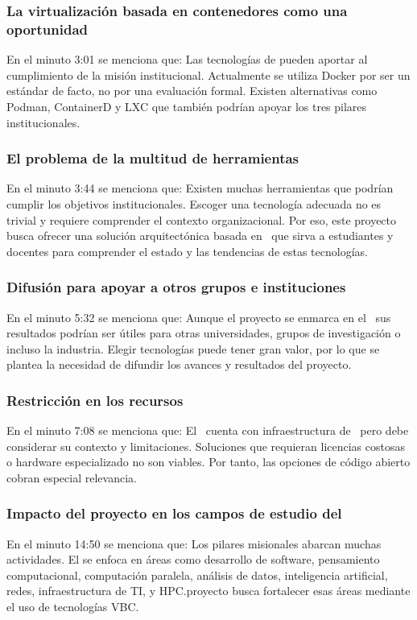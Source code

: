 \subsubsection{La virtualización basada en contenedores como una oportunidad}
En el minuto 3:01 se menciona que: Las tecnologías de \VBC pueden aportar al cumplimiento de la misión institucional. Actualmente se utiliza Docker por ser un estándar de facto, no por una evaluación formal. Existen alternativas como Podman, ContainerD y LXC que también podrían apoyar los tres pilares institucionales.

\subsubsection{El problema de la multitud de herramientas}
En el minuto 3:44 se menciona que: Existen muchas herramientas que podrían cumplir los objetivos institucionales. Escoger una tecnología adecuada no es trivial y requiere comprender el contexto organizacional. Por eso, este proyecto busca ofrecer una solución arquitectónica basada en \VBC\, que sirva a estudiantes y docentes para comprender el estado y las tendencias de estas tecnologías.

\subsubsection{Difusión para apoyar a otros grupos e instituciones}
En el minuto 5:32 se menciona que: Aunque el proyecto se enmarca en el \GRID\, sus resultados podrían ser útiles para otras universidades, grupos de investigación o incluso la industria. Elegir tecnologías \VBC{} puede tener gran valor, por lo que se plantea la necesidad de difundir los avances y resultados del proyecto.

\subsubsection{Restricción en los recursos}
En el minuto 7:08 se menciona que: El \GRID\ cuenta con infraestructura de \TI\, pero debe considerar su contexto y limitaciones. Soluciones que requieran licencias costosas o hardware especializado no son viables. Por tanto, las opciones de código abierto cobran especial relevancia.

\subsubsection{Impacto del proyecto en los campos de estudio del \GRID}
En el minuto 14:50 se menciona que: Los pilares misionales abarcan muchas actividades. El \GRID se enfoca en áreas como desarrollo de software, pensamiento computacional, computación paralela, análisis de datos, inteligencia artificial, redes, infraestructura de TI, y HPC.\@Este proyecto busca fortalecer esas áreas mediante el uso de tecnologías VBC.\@

